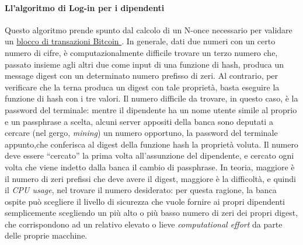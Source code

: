 			\paragraph{Ll'algoritmo di Log-in per i dipendenti}
			Questo algoritmo prende spunto dal calcolo di un N-once necessario per validare un \href{https://en.bitcoin.it/wiki/Block}{blocco di transazioni Bitcoin }.
			In generale, dati due numeri con un certo numero di cifre, è computazionalmente difficile trovare un terzo numero che, passato insieme agli altri due come input di una funzione di hash, produca un message digest con un determinato numero prefisso di zeri.
			Al contrario, per verificare che la terna produca un digest con tale proprietà, basta eseguire la funzione di hash con i tre valori.
			Il numero difficile da trovare, in questo caso, è la password del terminale: mentre il dipendente ha un nome utente simile al proprio e un passphrase a scelta, alcuni server appositi della banca sono deputati a cercare (nel gergo, \emph{mining}) un numero opportuno, la password del terminale appunto,che conferisca al digest della funzione hash la proprietà voluta.
Il numero deve essere ``cercato'' la prima volta all'assunzione del dipendente, e cercato ogni volta che viene indetto dalla banca il cambio di passphrase.
			 In teoria, maggiore è il numero di zeri prefissi che deve avere il digest, maggiore è la difficoltà, e quindi il \emph{CPU usage}, nel trovare il numero desiderato: per questa ragione, la banca ospite può scegliere il livello di sicurezza  che vuole fornire ai propri dipendenti semplicemente scegliendo un più alto o più basso numero di zeri dei propri digest, che corrispondono ad un relativo elevato o lieve \emph{computational effort} da parte delle proprie macchine.







